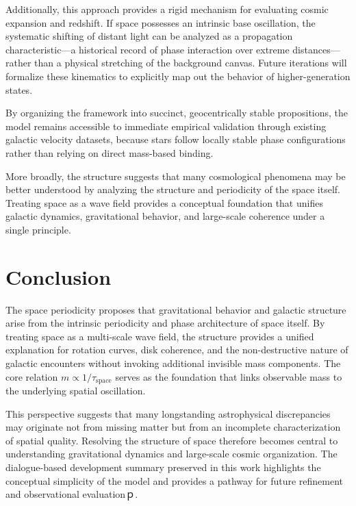 \documentclass[12pt]{article}
\begin{document}
Additionally, this approach provides a rigid mechanism for evaluating cosmic expansion and redshift. If space possesses an intrinsic base oscillation, the systematic shifting of distant light can be analyzed as a propagation characteristic—a historical record of phase interaction over extreme distances—rather than a physical stretching of the background canvas. Future iterations will formalize these kinematics to explicitly map out the behavior of higher-generation states.

By organizing the framework into succinct, geocentrically stable propositions, the model remains accessible to immediate empirical validation through existing galactic velocity datasets, because stars follow locally stable phase configurations rather than relying on direct mass-based binding.

More broadly, the structure suggests that many cosmological phenomena may be better understood by analyzing the structure and periodicity of the space itself. Treating space as a wave field provides a conceptual foundation that unifies galactic dynamics, gravitational behavior, and large-scale coherence under a single principle.

\section{Conclusion}

The space periodicity proposes that gravitational behavior and galactic structure arise from the intrinsic periodicity and phase architecture of space itself. By treating space as a multi-scale wave field, the structure provides a unified explanation for rotation curves, disk coherence, and the non-destructive nature of galactic encounters without invoking additional invisible mass components. The core relation \( m \propto 1/\tau_{\text{space}} \) serves as the foundation that links observable mass to the underlying spatial oscillation.

This perspective suggests that many longstanding astrophysical discrepancies may originate not from missing matter but from an incomplete characterization of spatial quality. Resolving the structure of space therefore becomes central to understanding gravitational dynamics and large-scale cosmic organization. The dialogue-based development summary preserved in this work highlights the conceptual simplicity of the model and provides a pathway for future refinement and observational evaluationｐ.
\end{document}
